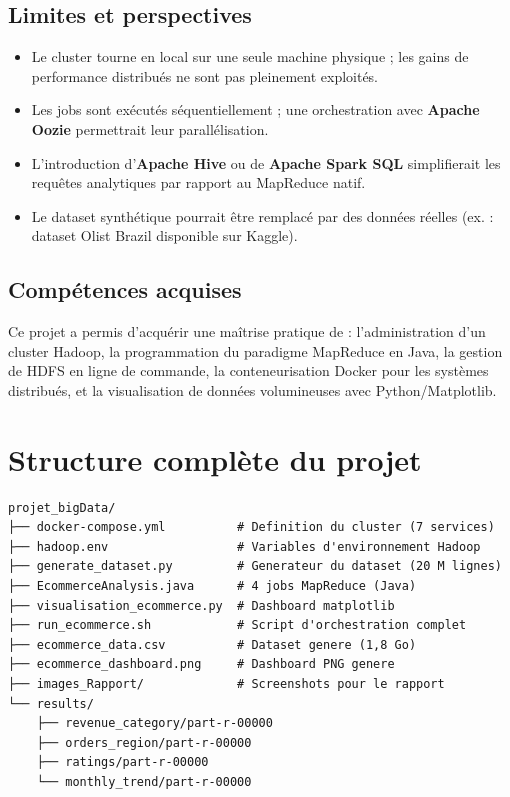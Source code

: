 \documentclass[12pt,a4paper]{article}
\begin{document}
\subsection{Limites et perspectives}

\begin{itemize}
  \item Le cluster tourne en local sur une seule machine physique ; les gains
        de performance distribués ne sont pas pleinement exploités.
  \item Les jobs sont exécutés séquentiellement ; une orchestration avec
        \textbf{Apache Oozie} permettrait leur parallélisation.
  \item L'introduction d'\textbf{Apache Hive} ou de \textbf{Apache Spark SQL}
        simplifierait les requêtes analytiques par rapport au MapReduce natif.
  \item Le dataset synthétique pourrait être remplacé par des données réelles
        (ex. : dataset Olist Brazil disponible sur Kaggle).
\end{itemize}

\subsection{Compétences acquises}

Ce projet a permis d'acquérir une maîtrise pratique de : l'administration d'un
cluster Hadoop, la programmation du paradigme MapReduce en Java, la gestion de
HDFS en ligne de commande, la conteneurisation Docker pour les systèmes
distribués, et la visualisation de données volumineuses avec Python/Matplotlib.

\appendix

\section{Structure complète du projet}

\begin{lstlisting}[caption={Arborescence des fichiers du projet}]
projet_bigData/
├── docker-compose.yml          # Definition du cluster (7 services)
├── hadoop.env                  # Variables d'environnement Hadoop
├── generate_dataset.py         # Generateur du dataset (20 M lignes)
├── EcommerceAnalysis.java      # 4 jobs MapReduce (Java)
├── visualisation_ecommerce.py  # Dashboard matplotlib
├── run_ecommerce.sh            # Script d'orchestration complet
├── ecommerce_data.csv          # Dataset genere (1,8 Go)
├── ecommerce_dashboard.png     # Dashboard PNG genere
├── images_Rapport/             # Screenshots pour le rapport
└── results/
    ├── revenue_category/part-r-00000
    ├── orders_region/part-r-00000
    ├── ratings/part-r-00000
    └── monthly_trend/part-r-00000
\end{lstlisting}
\end{document}
